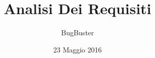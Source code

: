 



\title{\textbf{Analisi Dei Requisiti}}
\author{BugBuster}

\date{23 Maggio 2016}




\makeFrontPage

\tableofcontents
\listoffigures
\listoftables





